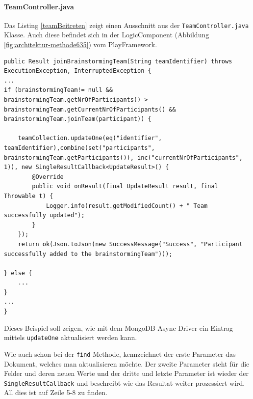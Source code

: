 \paragraph*{TeamController.java}
Das Listing \ref{teamBeitreten} zeigt einen Ausschnitt aus der \texttt{TeamController.java} Klasse. Auch diese befindet sich in der LogicComponent (Abbildung \ref{fig:architektur-methode635}) vom PlayFramework.
\begin{lstlisting}[caption={Einem Team beitreten}, label=teamBeitreten]
public Result joinBrainstormingTeam(String teamIdentifier) throws ExecutionException, InterruptedException {
...
if (brainstormingTeam!= null && brainstormingTeam.getNrOfParticipants() > brainstormingTeam.getCurrentNrOfParticipants() && brainstormingTeam.joinTeam(participant)) {

    teamCollection.updateOne(eq("identifier", teamIdentifier),combine(set("participants", brainstormingTeam.getParticipants()), inc("currentNrOfParticipants", 1)), new SingleResultCallback<UpdateResult>() {
        @Override
        public void onResult(final UpdateResult result, final Throwable t) {
            Logger.info(result.getModifiedCount() + " Team successfully updated");
        }
    });
    return ok(Json.toJson(new SuccessMessage("Success", "Participant successfully added to the brainstormingTeam")));

} else {
    ...
}
...
}
\end{lstlisting}

Dieses Beispiel soll zeigen, wie mit dem MongoDB Async Driver ein Eintrag mittels \texttt{updateOne} aktualisiert werden kann.

Wie auch schon bei der \texttt{find} Methode, kennzeichnet der erste Parameter das Dokument, welches man aktualisieren möchte. Der zweite Parameter steht für die Felder und deren neuen Werte und der dritte und letzte Parameter ist wieder der \texttt{SingleResultCallback} und beschreibt wie das Resultat weiter prozessiert wird. All dies ist auf Zeile 5-8 zu finden.

